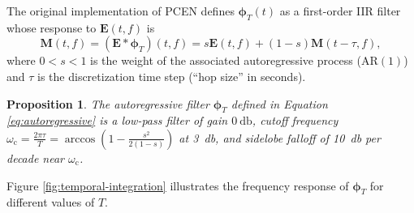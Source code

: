 \documentclass[journal]{IEEEtran}
\newtheorem{prop}[thm]{Proposition}
\theoremstyle{remark}
\begin{document}
The original implementation of PCEN \cite{wang2017icassp} defines $\boldsymbol{\phi}_T (t)$ as a first-order IIR filter whose response to $\mathbf{E}(t,f)$ is
\begin{equation}
\mathbf{M}(t,f) = (\mathbf{E} \ast \boldsymbol{\phi}_T)(t,f) = s \mathbf{E}(t,f) + (1-s) \mathbf{M}(t - \tau,f),
\label{eq:autoregressive}
\end{equation}
where $0<s<1$ is the weight of the associated autoregressive process ($\mathrm{AR}(1)$) and $\tau$ is the discretization time step (``hop size'' in seconds).

\begin{prop}
The autoregressive filter $\boldsymbol{\phi}_T$ defined in Equation \ref{eq:autoregressive} is a low-pass filter of gain $\SI{0}{\decibel}$, cutoff frequency
$\omega_\mathrm{c} = \frac{2\pi\tau}{T} = \arccos(1 - \frac{s^2}{2 (1-s)})$ at \SI{3}{\decibel}, and sidelobe falloff of \SI{10}{\decibel} per decade near $\omega_\mathrm{c}$.
\label{prop:temporal-integration}
\end{prop}

Figure \ref{fig:temporal-integration} illustrates the frequency response of $\boldsymbol{\phi}_T$ for different values of $T$.
\end{document}
